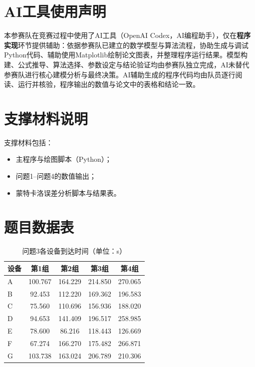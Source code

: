 \documentclass[12pt,a4paper]{article}
\newcommand{\tip}[1]{\par\noindent\textbf{【提示】} #1\par}
\begin{document}

\clearpage
\section*{AI工具使用声明}

本参赛队在竞赛过程中使用了AI工具（OpenAI Codex，AI编程助手），仅在\textbf{程序实现}环节提供辅助：依据参赛队已建立的数学模型与算法流程，协助生成与调试Python代码、辅助使用Matplotlib绘制论文图表，并整理程序运行结果。模型构建、公式推导、算法选择、参数设定与结论验证均由参赛队独立完成，AI未替代参赛队进行核心建模分析与最终决策。AI辅助生成的程序代码均由队员逐行阅读、运行并核验，程序输出的数值与论文中的表格和结论一致。

\appendix
\section{支撑材料说明}

支撑材料包括：
\begin{itemize}
  \item 主程序与绘图脚本（Python）；
  \item 问题1--问题4的数值输出；
  \item 蒙特卡洛误差分析脚本与结果表。
\end{itemize}

\section{题目数据表}

\begin{table}[H]
\centering
\caption{问题3各设备到达时间（单位：s）}
\label{tab:data3}
\begin{tabular}{lcccc}
\toprule
设备 & 第1组 & 第2组 & 第3组 & 第4组 \\
\midrule
A & 100.767 & 164.229 & 214.850 & 270.065 \\
B & 92.453 & 112.220 & 169.362 & 196.583 \\
C & 75.560 & 110.696 & 156.936 & 188.020 \\
D & 94.653 & 141.409 & 196.517 & 258.985 \\
E & 78.600 & 86.216 & 118.443 & 126.669 \\
F & 67.274 & 166.270 & 175.482 & 266.871 \\
G & 103.738 & 163.024 & 206.789 & 210.306 \\
\bottomrule
\end{tabular}
\end{table}
\end{document}
